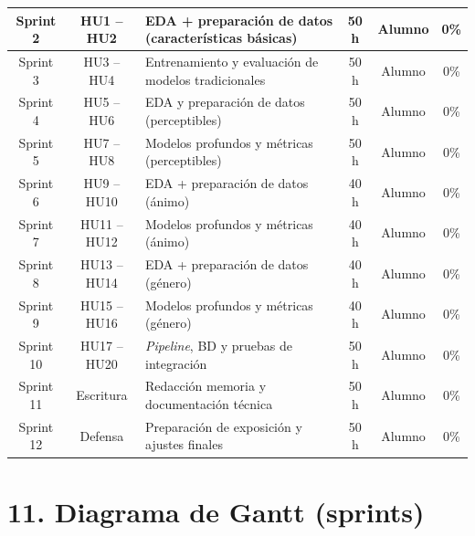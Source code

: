 \documentclass[
11pt, %
]{charter}
\begin{document}
\begin{table}[htpb]
\begin{tabularx}{\linewidth}{@{}|c|c|X|c|c|c|@{}}
Sprint 2 & HU1 – HU2 & EDA + preparación de datos (características básicas) & 50 h & Alumno & 0\% \\ \hline
Sprint 3 & HU3 – HU4 & Entrenamiento y evaluación de modelos tradicionales & 50 h & Alumno & 0\% \\ \hline
Sprint 4 & HU5 – HU6 & EDA y preparación de datos (perceptibles) & 50 h & Alumno & 0\% \\ \hline
Sprint 5 & HU7 – HU8 & Modelos profundos y métricas (perceptibles) & 50 h & Alumno & 0\% \\ \hline
Sprint 6 & HU9 – HU10 & EDA + preparación de datos (ánimo) & 40 h & Alumno & 0\% \\ \hline
Sprint 7 & HU11 – HU12 & Modelos profundos y métricas (ánimo) & 40 h & Alumno & 0\% \\ \hline
Sprint 8 & HU13 – HU14 & EDA + preparación de datos (género) & 40 h & Alumno & 0\% \\ \hline
Sprint 9 & HU15 – HU16 & Modelos profundos y métricas (género) & 40 h & Alumno & 0\% \\ \hline
Sprint 10 & HU17 – HU20 & \textit{Pipeline}, BD y pruebas de integración & 50 h & Alumno & 0\% \\ \hline
Sprint 11 & Escritura & Redacción memoria y documentación técnica & 50 h & Alumno & 0\% \\ \hline
Sprint 12 & Defensa & Preparación de exposición y ajustes finales & 50 h & Alumno & 0\% \\ \hline
\end{tabularx}
\end{table}

\newpage


\section{11. Diagrama de Gantt (sprints)}
\label{sec:gantt}

\end{document}
